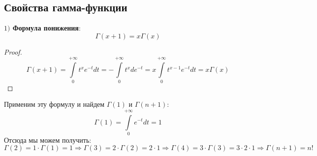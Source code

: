 \documentclass[12pt]{article}
\theoremstyle{definition}
\newcommand{\ddint}[2]{\displaystyle\int\limits_{#1}^{#2}}
\begin{document}
\subsection*{Свойства гамма-функции}
\textbf{$1)$ Формула понижения}: 
$$
	\Gamma(x+1) = x\Gamma(x)
$$
\begin{proof}
	$$
		\Gamma(x+1) = \ddint{0}{+\infty}t^x e^{-t}dt =  -\ddint{0}{+\infty}t^x de^{-t} = x \ddint{0}{+\infty}t^{x-1}e^{-t}dt = x\Gamma(x)
	$$
\end{proof}
Применим эту формулу и найдем $\Gamma(1)$ и $\Gamma(n+1)$: 
$$
	\Gamma(1) = \ddint{0}{+\infty}e^{-t}dt = 1 
$$	
Отсюда мы можем получить:
$$
	\Gamma(2) = 1{\cdot}\Gamma(1) = 1 \Rightarrow \Gamma(3) = 2{\cdot}\Gamma(2) = 2{\cdot}1 \Rightarrow \Gamma(4) = 3{\cdot}\Gamma(3) = 3{\cdot}2{\cdot}1 \Rightarrow \Gamma(n+1) = n!
$$
\end{document}

